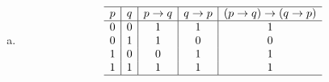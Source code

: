{{\begin{practices}
\begin{enumerate}[a)]
{\begin{table}[H]
\[\begin{array}{c|c|c|c|c}
                                0 & 1 & 1 & 1 & 1 \\
                                1 & 0 & 0 & 0 & 1 \\
                                1 & 1 & 1 & 1 & 1 \\
                                \hline
                            \end{array}
                        \]
                    \end{table}
                }
                \item
                {
                    \begin{table}[H]
                        \[
                            \begin{array}{c|c|c|c|c}
                                \hline
                                p & q & p \rightarrow q & q \rightarrow p & (p \rightarrow q) \rightarrow (q \rightarrow p) \\
                                \hline
                                0 & 0 & 1 & 1 & 1 \\
                                0 & 1 & 1 & 0 & 0 \\
                                1 & 0 & 0 & 1 & 1 \\
                                1 & 1 & 1 & 1 & 1 \\
                                \hline
                            \end{array}
                        \]
                    \end{table}
                }
            \end{enumerate}
        \end{practices}

}}
